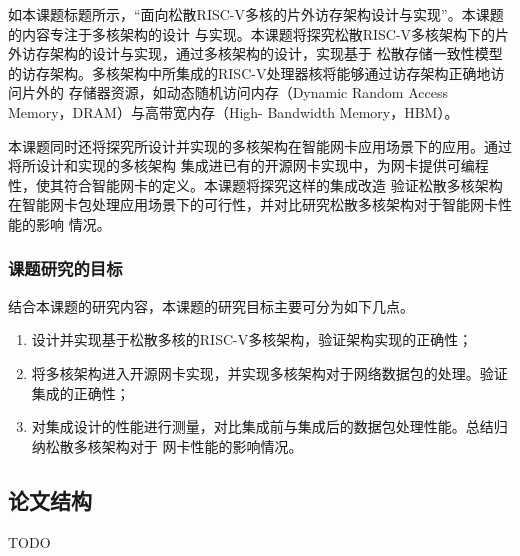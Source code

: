 如本课题标题所示，“面向松散RISC-V多核的片外访存架构设计与实现”。本课题的内容专注于多核架构的设计
与实现。本课题将探究松散RISC-V多核架构下的片外访存架构的设计与实现，通过多核架构的设计，实现基于
松散存储一致性模型的访存架构。多核架构中所集成的RISC-V处理器核将能够通过访存架构正确地访问片外的
存储器资源，如动态随机访问内存（Dynamic Random Access Memory，DRAM）与高带宽内存（High-
Bandwidth Memory，HBM）。

本课题同时还将探究所设计并实现的多核架构在智能网卡应用场景下的应用。通过将所设计和实现的多核架构
集成进已有的开源网卡实现中，为网卡提供可编程性，使其符合智能网卡的定义。本课题将探究这样的集成改造
验证松散多核架构在智能网卡包处理应用场景下的可行性，并对比研究松散多核架构对于智能网卡性能的影响
情况。

\subsubsection{课题研究的目标}

结合本课题的研究内容，本课题的研究目标主要可分为如下几点。

\begin{enumerate}
  \item 设计并实现基于松散多核的RISC-V多核架构，验证架构实现的正确性；
  \item 将多核架构进入开源网卡实现，并实现多核架构对于网络数据包的处理。验证集成的正确性；
  \item 对集成设计的性能进行测量，对比集成前与集成后的数据包处理性能。总结归纳松散多核架构对于
        网卡性能的影响情况。
\end{enumerate}

\subsection{论文结构}

TODO
